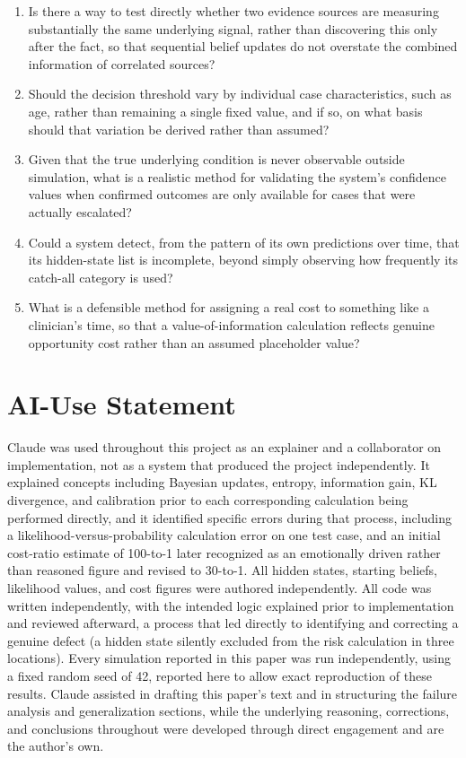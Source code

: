 \documentclass{article}
\begin{document}
\begin{enumerate}
\def\labelenumi{\arabic{enumi}.}
\tightlist
\item
  Is there a way to test directly whether two evidence sources are
  measuring substantially the same underlying signal, rather than
  discovering this only after the fact, so that sequential belief
  updates do not overstate the combined information of correlated
  sources?
\item
  Should the decision threshold vary by individual case characteristics,
  such as age, rather than remaining a single fixed value, and if so, on
  what basis should that variation be derived rather than assumed?
\item
  Given that the true underlying condition is never observable outside
  simulation, what is a realistic method for validating the system's
  confidence values when confirmed outcomes are only available for cases
  that were actually escalated?
\item
  Could a system detect, from the pattern of its own predictions over
  time, that its hidden-state list is incomplete, beyond simply
  observing how frequently its catch-all category is used?
\item
  What is a defensible method for assigning a real cost to something
  like a clinician's time, so that a value-of-information calculation
  reflects genuine opportunity cost rather than an assumed placeholder
  value?
\end{enumerate}

\hypertarget{ai-use-statement}{%
\section{AI-Use Statement}\label{ai-use-statement}}

Claude was used throughout this project as an explainer and a
collaborator on implementation, not as a system that produced the
project independently. It explained concepts including Bayesian updates,
entropy, information gain, KL divergence, and calibration prior to each
corresponding calculation being performed directly, and it identified
specific errors during that process, including a
likelihood-versus-probability calculation error on one test case, and an
initial cost-ratio estimate of 100-to-1 later recognized as an
emotionally driven rather than reasoned figure and revised to 30-to-1.
All hidden states, starting beliefs, likelihood values, and cost figures
were authored independently. All code was written independently, with
the intended logic explained prior to implementation and reviewed
afterward, a process that led directly to identifying and correcting a
genuine defect (a hidden state silently excluded from the risk
calculation in three locations). Every simulation reported in this paper
was run independently, using a fixed random seed of 42, reported here to
allow exact reproduction of these results. Claude assisted in drafting
this paper's text and in structuring the failure analysis and
generalization sections, while the underlying reasoning, corrections,
and conclusions throughout were developed through direct engagement and
are the author's own.
\end{document}
